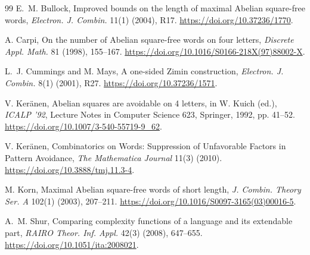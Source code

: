 \documentclass[11pt]{article}
\theoremstyle{definition}
\begin{document}
\begin{thebibliography}{99}
E.~M. Bullock,
\newblock Improved bounds on the length of maximal Abelian square-free words,
\newblock \emph{Electron. J. Combin.} 11(1) (2004), R17.
\newblock \url{https://doi.org/10.37236/1770}.

A. Carpi,
\newblock On the number of Abelian square-free words on four letters,
\newblock \emph{Discrete Appl. Math.} 81 (1998), 155--167.
\newblock \url{https://doi.org/10.1016/S0166-218X(97)88002-X}.

L.~J. Cummings and M. Mays,
\newblock A one-sided Zimin construction,
\newblock \emph{Electron. J. Combin.} 8(1) (2001), R27.
\newblock \url{https://doi.org/10.37236/1571}.

V. Ker\"anen,
\newblock Abelian squares are avoidable on 4 letters,
\newblock in W. Kuich (ed.), \emph{ICALP '92}, Lecture Notes in Computer Science 623, Springer, 1992, pp. 41--52.
\newblock \url{https://doi.org/10.1007/3-540-55719-9_62}.

V. Ker\"anen,
\newblock Combinatorics on Words: Suppression of Unfavorable Factors in Pattern Avoidance,
\newblock \emph{The Mathematica Journal} 11(3) (2010).
\newblock \url{https://doi.org/10.3888/tmj.11.3-4}.

M. Korn,
\newblock Maximal Abelian square-free words of short length,
\newblock \emph{J. Combin. Theory Ser. A} 102(1) (2003), 207--211.
\newblock \url{https://doi.org/10.1016/S0097-3165(03)00016-5}.

A.~M. Shur,
\newblock Comparing complexity functions of a language and its extendable part,
\newblock \emph{RAIRO Theor. Inf. Appl.} 42(3) (2008), 647--655.
\newblock \url{https://doi.org/10.1051/ita:2008021}.
\end{thebibliography}
\end{document}
